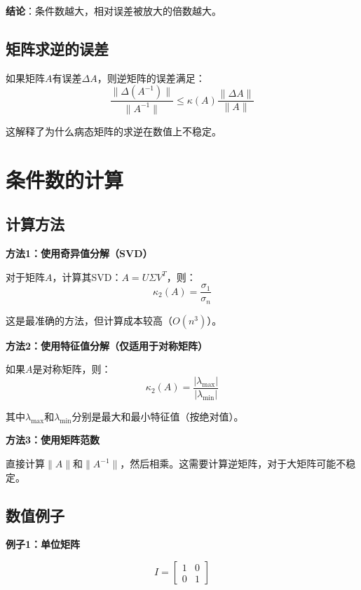 \documentclass[12pt,a4paper]{article}
\begin{document}
\textbf{结论}：条件数越大，相对误差被放大的倍数越大。

\subsection{矩阵求逆的误差}

如果矩阵$A$有误差$\Delta A$，则逆矩阵的误差满足：
\begin{equation}
\frac{\|\Delta (A^{-1})\|}{\|A^{-1}\|} \leq \kappa(A) \frac{\|\Delta A\|}{\|A\|}
\end{equation}

这解释了为什么病态矩阵的求逆在数值上不稳定。

\section{条件数的计算}

\subsection{计算方法}

\textbf{方法1：使用奇异值分解（SVD）}

对于矩阵$A$，计算其SVD：$A = U\Sigma V^T$，则：
\begin{equation}
\kappa_2(A) = \frac{\sigma_1}{\sigma_n}
\end{equation}

这是最准确的方法，但计算成本较高（$O(n^3)$）。

\textbf{方法2：使用特征值分解（仅适用于对称矩阵）}

如果$A$是对称矩阵，则：
\begin{equation}
\kappa_2(A) = \frac{|\lambda_{\max}|}{|\lambda_{\min}|}
\end{equation}

其中$\lambda_{\max}$和$\lambda_{\min}$分别是最大和最小特征值（按绝对值）。

\textbf{方法3：使用矩阵范数}

直接计算$\|A\|$和$\|A^{-1}\|$，然后相乘。这需要计算逆矩阵，对于大矩阵可能不稳定。

\subsection{数值例子}

\textbf{例子1：单位矩阵}

$$I = \begin{bmatrix} 1 & 0 \\ 0 & 1 \end{bmatrix}$$
\end{document}
